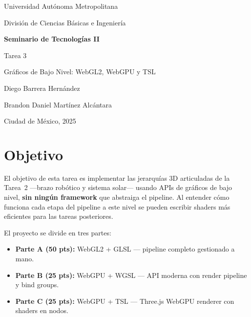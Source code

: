 \documentclass[12pt,a4paper]{article}
\begin{document}
\begin{titlepage}
  \centering
  \vspace*{1.5cm}

  {\Large Universidad Autónoma Metropolitana\par}
  \vspace{0.4cm}
  {\large División de Ciencias Básicas e Ingeniería\par}

  \vspace{2.5cm}
  {\Huge\bfseries Seminario de Tecnologías II\par}
  \vspace{0.6cm}
  {\LARGE Tarea 3\par}
  \vspace{0.4cm}
  {\large Gráficos de Bajo Nivel: WebGL2, WebGPU y TSL\par}

  \vspace{3cm}
  {\large Diego Barrera Hernández\par}
  \vspace{0.3cm}
  {\large Brandon Daniel Martínez Alcántara\par}

  \vfill
  {\large Ciudad de México, 2025\par}
\end{titlepage}

\tableofcontents
\newpage

\section{Objetivo}

El objetivo de esta tarea es implementar las jerarquías 3D articuladas de la Tarea~2 —brazo robótico y sistema solar— usando APIs de gráficos de bajo nivel, \textbf{sin ningún framework} que abstraiga el pipeline. Al entender cómo funciona cada etapa del pipeline a este nivel se pueden escribir shaders más eficientes para las tareas posteriores.

El proyecto se divide en tres partes:

\begin{itemize}[leftmargin=*]
  \item \textbf{Parte A (50 pts):} WebGL2 + GLSL — pipeline completo gestionado a mano.
  \item \textbf{Parte B (25 pts):} WebGPU + WGSL — API moderna con render pipeline y bind groups.
  \item \textbf{Parte C (25 pts):} WebGPU + TSL — Three.js WebGPU renderer con shaders en nodos.
\end{itemize}
\end{document}
